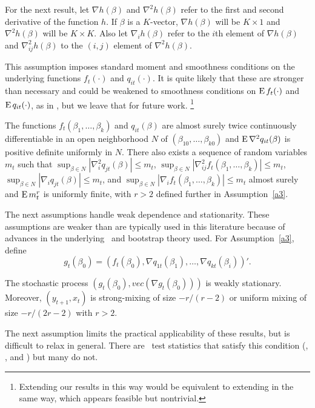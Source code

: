\documentclass[12pt,fleqn]{article}
\begin{document}
For the next result, let $\nabla h(\beta)$ and $\nabla^2 h(\beta)$
refer to the first and second derivative of the function $h$. If
$\beta$ is a $K$-vector, $\nabla h(\beta)$ will be $K \times 1$ and
$\nabla^2 h(\beta)$ will be $K \times K$. Also let $\nabla_i h(\beta)$
refer to the $i$th element of $\nabla h(\beta)$ and $\nabla_{ij}^2
h(\beta)$ to the $(i,j)$ element of $\nabla^2 h(\beta)$.

This assumption imposes standard moment and smoothness conditions on
the underlying functions $f_t(\cdot)$ and $q_{it}(\cdot)$. It is quite
likely that these are stronger than necessary and could be weakened to
smoothness conditions on $\operatorname{E} f_t(\cdot)$ and $\operatorname{E} q_{it}(\cdot)$, as in
\cite{Mcc:00}, but we leave that for future work.%
\footnote{Extending our results in this way would be equivalent to
  extending \cite{JoD:00} in the same way, which appears feasible but
  nontrivial.} %

\begin{asmp}\label{a2}
  The functions $f_t(\beta_1,\dots,\beta_k)$ and $q_{it}(\beta)$ are
  almost surely twice continuously differentiable in an open
  neighborhood $N$ of $(\beta_{10},\dots,\beta_{k0})$ and $\operatorname{E} \nabla^2
  q_{it}(\beta)$ is positive definite uniformly in $N$. There also
  exists a sequence of random variables $m_t$ such that
  $\sup_{\beta \in N} |\nabla_i^2 q_{jt}(\beta)| \leq m_t$,
  $\sup_{\beta \in N} |\nabla_{ij}^2 f_t(\beta_1,\dots,\beta_k)| \leq m_t$,
  $\sup_{\beta \in N} |\nabla_i q_{jt}(\beta)| \leq m_t$, and
  $\sup_{\beta \in N} |\nabla_i f_t(\beta_1,\dots,\beta_k)| \leq m_t$
  almost surely and $\operatorname{E} m_t^r$ is uniformly finite, with $r > 2$
  defined further in Assumption~\ref{a3}.
\end{asmp}

The next assumptions handle weak dependence and stationarity. These
assumptions are weaker than are typically used in this literature
because of advances in the underlying \clt\ and bootstrap theory used.
For Assumption~\ref{a3}, define
\[
  g_t(\beta_0) = (f_t(\beta_0), \nabla q_{1t}(\beta_1),\dots,\nabla q_{kt}(\beta_i))'.
\]

\begin{asmp}\label{a3}
  The stochastic process $(g_t(\beta_0), vec(\nabla g_t(\beta_0)))$ is
  weakly stationary. Moreover, $(y_{t+1},x_t)$ is strong-mixing of
  size $-r/(r-2)$ or uniform mixing of size $-r/(2r-2)$ with $r>2$.
\end{asmp}

The next assumption limits the practical applicability of these
results, but is difficult to relax in general. There are \oos\ test
statistics that satisfy this condition (\citealp{GiW:06},
\citealp{ClW:06,ClW:07}, and \citealp{Cal:15}) but many do not.
\end{document}
